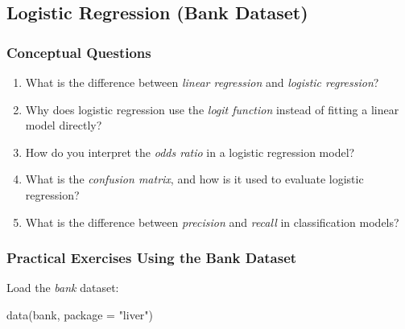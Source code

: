 \documentclass[
  11pt,
]{book}
\makeatletter
\newenvironment{Shaded}{}{}
\newcommand{\AttributeTok}[1]{#1}
\newcommand{\FunctionTok}[1]{#1}
\newcommand{\NormalTok}[1]{#1}
\newcommand{\StringTok}[1]{\textcolor[rgb]{0.39,0.39,0.39}{#1}}
\providecommand{\tightlist}{%
  \setlength{\itemsep}{0pt}\setlength{\parskip}{0pt}}
\newenvironment{kframe}{%
\medskip{}
\setlength{\fboxsep}{.8em}
 \def\at@end@of@kframe{}%
 \ifinner\ifhmode%
  \def\at@end@of@kframe{\end{minipage}}%
  \begin{minipage}{\columnwidth}%
 \fi\fi%
 \def\FrameCommand##1{\hskip\@totalleftmargin \hskip-\fboxsep
 \colorbox{shadecolor}{##1}\hskip-\fboxsep
     \hskip-\linewidth \hskip-\@totalleftmargin \hskip\columnwidth}%
 \MakeFramed {\advance\hsize-\width
   \@totalleftmargin\z@ \linewidth\hsize
   \@setminipage}}%
 {\par\unskip\endMakeFramed%
 \at@end@of@kframe}
\renewenvironment{Shaded}{\begin{kframe}}{\end{kframe}}
\theoremstyle{definition}
\theoremstyle{definition}
\theoremstyle{definition}
\theoremstyle{definition}
\theoremstyle{remark}
\makeatother
\begin{document}
\subsection*{Logistic Regression (Bank Dataset)}\label{logistic-regression-bank-dataset}


\subsubsection*{Conceptual Questions}\label{conceptual-questions-8}


\begin{enumerate}
\def\labelenumi{\arabic{enumi}.}
\setcounter{enumi}{34}
\tightlist
\item
  What is the difference between \emph{linear regression} and \emph{logistic regression}?\\
\item
  Why does logistic regression use the \emph{logit function} instead of fitting a linear model directly?\\
\item
  How do you interpret the \emph{odds ratio} in a logistic regression model?\\
\item
  What is the \emph{confusion matrix}, and how is it used to evaluate logistic regression?\\
\item
  What is the difference between \emph{precision} and \emph{recall} in classification models?
\end{enumerate}

\subsubsection*{Practical Exercises Using the Bank Dataset}\label{practical-exercises-using-the-bank-dataset}


Load the \emph{bank} dataset:

\begin{Shaded}
\begin{Highlighting}[]
\FunctionTok{data}\NormalTok{(bank, }\AttributeTok{package =} \StringTok{"liver"}\NormalTok{)}
\end{Highlighting}
\end{Shaded}
\end{document}
